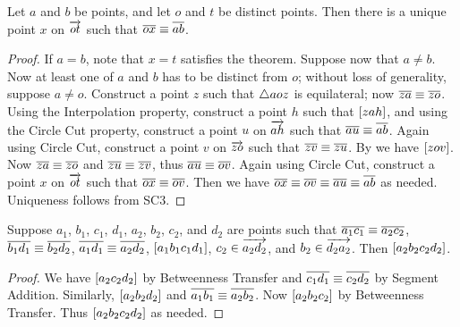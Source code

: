 \begin{construct}
Let \(a\) and \(b\) be points, and let \(o\) and \(t\) be distinct points.
Then there is a unique point \(x\) on \(\overrightarrow{ot}\) such that \(\overline{ox} \equiv \overline{ab}\).
\end{construct}

\begin{proof}
If \(a = b\), note that \(x = t\) satisfies the theorem.
Suppose now that \(a \neq b\).
Now at least one of \(a\) and \(b\) has to be distinct from \(o\); without loss of generality, suppose \(a \neq o\).
Construct a point \(z\) such that \(\bigtriangleup{aoz}\) is equilateral; now \(\overline{za} \equiv \overline{zo}\).
Using the Interpolation property, construct a point \(h\) such that \([ z a h ]\), and using the Circle Cut property, construct a point \(u\) on \(\overrightarrow{ah}\) such that \(\overline{au} \equiv \overline{ab}\).
Again using Circle Cut, construct a point \(v\) on \(\overrightarrow{zo}\) such that \(\overline{zv} \equiv \overline{zu}\).
By  we have \([ z o v ]\).
Now \(\overline{za} \equiv \overline{zo}\) and \(\overline{zu} \equiv \overline{zv}\), thus \(\overline{au} \equiv \overline{ov}\).
Again using Circle Cut, construct a point \(x\) on \(\overrightarrow{ot}\) such that \(\overline{ox} \equiv \overline{ov}\).
Then we have \(\overline{ox} \equiv \overline{ov} \equiv \overline{au} \equiv \overline{ab}\) as needed.
Uniqueness follows from SC3.
\end{proof}

\begin{lem}
Suppose \(a_1\), \(b_1\), \(c_1\), \(d_1\), \(a_2\), \(b_2\), \(c_2\), and \(d_2\) are points such that \(\overline{a_1c_1} \equiv \overline{a_2c_2}\), \(\overline{b_1d_1} \equiv \overline{b_2d_2}\), \(\overline{a_1d_1} \equiv \overline{a_2d_2}\), \([ a_1b_1c_1d_1 ]\), \(c_2 \in \overrightarrow{a_2d_2}\), and \(b_2 \in \overrightarrow{d_2a_2}\).
Then \([ a_2b_2c_2d_2 ]\).
\end{lem}

\begin{proof}
We have \([ a_2 c_2 d_2 ]\) by Betweenness Transfer and \(\overline{c_1d_1} \equiv \overline{c_2d_2}\) by Segment Addition.
Similarly, \([ a_2 b_2 d_2 ]\) and \(\overline{a_1b_1} \equiv \overline{a_2b_2}\).
Now \([ a_2 b_2 c_2 ]\) by Betweenness Transfer.
Thus \([ a_2b_2c_2d_2 ]\) as needed.
\end{proof}

